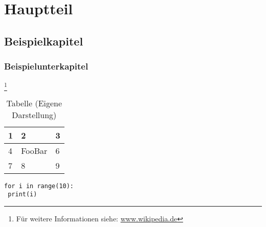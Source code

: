\chapter{Hauptteil}
\label{sec:hauptteil}


\section{Beispielkapitel}
\label{sec:beispiel}

\Blindtext

\subsection{Beispielunterkapitel}
\label{subsec:beispiel}

\footnote{Für weitere Informationen siehe: \url{www.wikipedia.de}}

\blindtext

\begin{table}
    \caption[Tabelle]{Tabelle (Eigene Darstellung)}
    \begin{center}
        \begin{tabular}{| p{2cm} | p{2cm} | p{2cm} |}
            \hline
            1 & 2 & 3 \\
            \hline
            4 & FooBar & 6 \\
            \hline
            7 & 8 & 9 \\
            \hline
            \end{tabular}
    \end{center}
\end{table}

\lstset{language=Python}
\begin{lstlisting}[caption={Python Print Command}]
for i in range(10):
 print(i)
\end{lstlisting}

